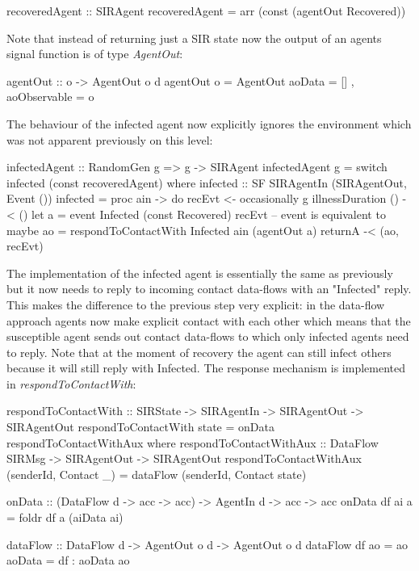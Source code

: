 \begin{HaskellCode}
recoveredAgent :: SIRAgent
recoveredAgent = arr (const (agentOut Recovered))
\end{HaskellCode}

Note that instead of returning just a SIR state now the output of an agents signal function is of type \textit{AgentOut}:

\begin{HaskellCode}
agentOut :: o -> AgentOut o d
agentOut o = AgentOut {
    aoData       = []
  , aoObservable = o }
\end{HaskellCode}

The behaviour of the infected agent now explicitly ignores the environment which was not apparent previously on this level:

\begin{HaskellCode}
infectedAgent :: RandomGen g => g -> SIRAgent
infectedAgent g = switch infected (const recoveredAgent)
  where
    infected :: SF SIRAgentIn (SIRAgentOut, Event ())
    infected = proc ain -> do
      recEvt <- occasionally g illnessDuration () -< ()
      let a  = event Infected (const Recovered) recEvt -- event is equivalent to maybe
          ao = respondToContactWith Infected ain (agentOut a)
      returnA -< (ao, recEvt)
\end{HaskellCode}

The implementation of the infected agent is essentially the same as previously but it now needs to reply to incoming contact data-flows with an "Infected" reply. This makes the difference to the previous step very explicit: in the data-flow approach agents now make explicit contact with each other which means that the susceptible agent sends out contact data-flows to which only infected agents need to reply. Note that at the moment of recovery the agent can still infect others because it will still reply with Infected. The response mechanism is implemented in \textit{respondToContactWith}:

\begin{HaskellCode}
respondToContactWith :: SIRState -> SIRAgentIn -> SIRAgentOut -> SIRAgentOut
respondToContactWith state = onData respondToContactWithAux
  where
    respondToContactWithAux :: DataFlow SIRMsg -> SIRAgentOut -> SIRAgentOut
    respondToContactWithAux (senderId, Contact _) = dataFlow (senderId, Contact state)
    
onData :: (DataFlow d -> acc -> acc) -> AgentIn d -> acc -> acc
onData df ai a = foldr df a (aiData ai)

dataFlow :: DataFlow d -> AgentOut o d -> AgentOut o d
dataFlow df ao = ao { aoData = df : aoData ao }
\end{HaskellCode}

